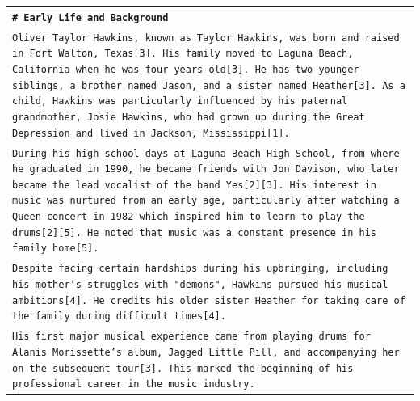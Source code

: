 \begin{longtable}{p{\textwidth}}
\vspace{1pt}
\texttt{\small{\textbf{\# Early Life and Background}}} \\
\texttt{\small{Oliver Taylor Hawkins, known as Taylor Hawkins, was born and raised in Fort Walton, Texas[3]. His family moved to Laguna Beach, California when he was four years old[3]. He has two younger siblings, a brother named Jason, and a sister named Heather[3]. As a child, Hawkins was particularly influenced by his paternal grandmother, Josie Hawkins, who had grown up during the Great Depression and lived in Jackson, Mississippi[1].}} \\
\texttt{\small{During his high school days at Laguna Beach High School, from where he graduated in 1990, he became friends with Jon Davison, who later became the lead vocalist of the band Yes[2][3]. His interest in music was nurtured from an early age, particularly after watching a Queen concert in 1982 which inspired him to learn to play the drums[2][5]. He noted that music was a constant presence in his family home[5].}} \\
\texttt{\small{Despite facing certain hardships during his upbringing, including his mother's struggles with "demons", Hawkins pursued his musical ambitions[4]. He credits his older sister Heather for taking care of the family during difficult times[4].}} \\
\texttt{\small{His first major musical experience came from playing drums for Alanis Morissette's album, Jagged Little Pill, and accompanying her on the subsequent tour[3]. This marked the beginning of his professional career in the music industry.}} \\


\end{longtable}
